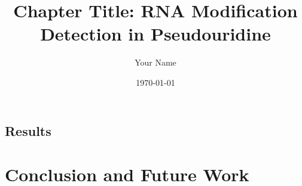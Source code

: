 \documentclass[12pt]{book}
\begin{document}
  \title{Chapter Title: RNA Modification Detection in Pseudouridine}
  \author{Your Name}
  \date{\today}

  \maketitle

  \tableofcontents
  \newpage


%  
  
  


  \section{Results}
    \label{sec:results}


  \chapter{Conclusion and Future Work}
  \label{ch:conclusion}

  
\end{document}
